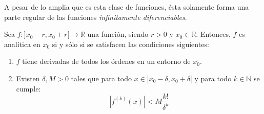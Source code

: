 \documentclass[12pt]{report}
\newcounter{it}
\theoremstyle{largebreak}
\newcommand\abs[1]{\ensuremath{\left|#1\right|}}
\newcommand\cf[3]{\ensuremath{#1:#2\rightarrow#3}}
\begin{document}
    A pesar de lo amplia que es esta clase de funciones, ésta solamente forma una parte regular de las funciones \textit{infinitamente diferenciables}.

    \begin{propo}
        Sea $\cf{f}{]x_0-r,x_0+r[}{\mathbb{R}}$ una función, siendo $r>0$ y $x_0\in\mathbb{R}$. Entonces, $f$ es analítica en $x_0$ si y sólo si se satisfacen las condiciones siguientes:
        \begin{enumerate}
            \item $f$ tiene derivadas de todos los órdenes en un entorno de $x_0$.
            \item Existen $\delta,M>0$ tales que para todo $x\in]x_0-\delta,x_0+\delta[$ y para todo $k\in\mathbb{N}$ se cumple:
            \begin{equation*}
                \abs{f^{(k)}(x)}<M\frac{k!}{\delta^k}
            \end{equation*}
        \end{enumerate}
    \end{propo}
\end{document}
